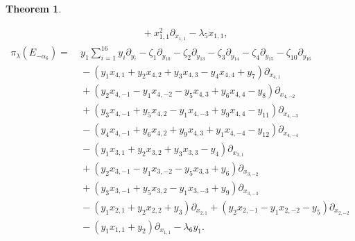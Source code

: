 \documentclass[12pt]{article}
\numberwithin{equation}{section}
\newtheorem{theorem}{Theorem}[section]
\theoremstyle{definition}
\theoremstyle{remark}
\begin{document}
\begin{theorem}
\begin{enumerate}[(i)]
\begin{align}
			&\:+x_{1,1}^2\partial_{x_{1,1}}-\lambda_5x_{1,1},\label{3.89}
		\end{align}
		\begin{align}
			\pi_{\lambda}(E_{-\alpha_6})=&\:y_1\mathop{\textstyle\sum}\limits_{i=1}^{16}y_i\partial_{y_{i}}-\zeta_1\partial_{y_{10}}-\zeta_2\partial_{y_{13}}-\zeta_3\partial_{y_{14}}-\zeta_4\partial_{y_{15}}-\zeta_{10}\partial_{y_{16}}\nonumber\\
			&\:-(y_1x_{4,1}+y_2x_{4,2}+y_3x_{4,3}-y_4x_{4,4}+y_7)\partial_{x_{4,1}}\nonumber\\
			&\:+(y_2x_{4,-1}-y_1x_{4,-2}-y_5x_{4,3}+y_6x_{4,4}-y_8)\partial_{x_{4,-2}}\nonumber\\
			&\:+(y_3x_{4,-1}+y_5x_{4,2}-y_1x_{4,-3}+y_9x_{4,4}-y_{11})\partial_{x_{4,-3}}\nonumber\\
			&\:-(y_4x_{4,-1}+y_6x_{4,2}+y_9x_{4,3}+y_1x_{4,-4}-y_{12})\partial_{x_{4,-4}}\nonumber\\
			&\:-(y_1x_{3,1}+y_2x_{3,2}+y_3x_{3,3}-y_4)\partial_{x_{3,1}}\nonumber\\
			&\:+(y_2x_{3,-1}-y_1x_{3,-2}-y_5x_{3,3}+y_6)\partial_{x_{3,-2}}\nonumber\\
			&\:+(y_3x_{3,-1}+y_5x_{3,2}-y_1x_{3,-3}+y_9)\partial_{x_{3,-3}}\nonumber\\
			&\:-(y_1x_{2,1}+y_2x_{2,2}+y_3)\partial_{x_{2,1}}+(y_2x_{2,-1}-y_1x_{2,-2}-y_5)\partial_{x_{2,-2}}\nonumber\\
			&\:-(y_1x_{1,1}+y_2)\partial_{x_{1,1}}-\lambda_6y_1.\label{3.90}
		\end{align}		
	\end{enumerate}
\end{theorem}
\end{document}
